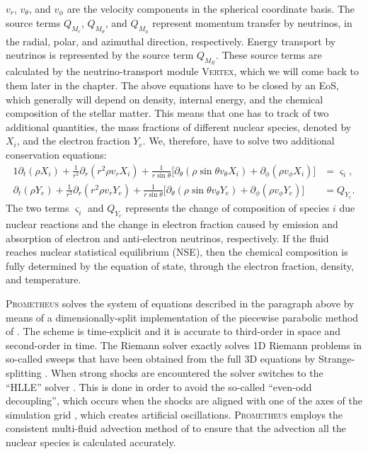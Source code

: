 $v_r$, $v_{\theta}$, and $v_{\phi}$ are the velocity components in the spherical
coordinate basis. The source terms $Q_{M_{r}}$, $Q_{M_{\theta}}$, and $Q_{M_{\phi}}$ represent
momentum transfer by neutrinos, in the radial, polar, and azimuthal direction, respectively.
Energy transport by neutrinos is represented by the source term $Q_{M_{E}}$. These source terms are calculated
by the neutrino-transport module \textsc{Vertex}, which we will come back to them later in the chapter.
The above equations have to be closed by an EoS, which generally will depend on 
density, internal energy, and the chemical composition of the stellar matter.
This means that one has to track of two additional quantities, the mass fractions
of different nuclear species, denoted by $X_i$, and the electron fraction $Y_e$. We, therefore,
have to solve two additional conservation equations:
\begin{alignat}{1}
\partial_t (\rho X_i) + \frac{1}{r^2} \partial_r (r^2 \rho v_r X_i) + \frac{1}{r \sin{\theta}} \bigg[ \partial_{\theta} (\rho \sin{\theta} v_{\theta} X_i) + \partial_{\phi} (\rho v_{\phi} X_i) \bigg] &= \varsigma_i, \label{eqN:contxi} \\
\partial_t (\rho Y_e) + \frac{1}{r^2} \partial_r (r^2 \rho v_r Y_e) + \frac{1}{r \sin{\theta}} \bigg[ \partial_{\theta} (\rho \sin{\theta} v_{\theta} Y_e) + \partial_{\phi} (\rho v_{\phi} Y_e) \bigg] &= Q_{Y_e}. \label{eqN:contye}
\end{alignat}
The two terms $\varsigma_i$ and $Q_{Y_e}$ represents the change of composition of species $i$ due nuclear reactions
and the change in electron fraction caused by emission and absorption of electron and anti-electron neutrinos,
respectively. If the fluid reaches nuclear statistical equilibrium (NSE), then the chemical 
composition is fully determined by the equation of state, through the electron fraction, density, and
temperature.

\textsc{Prometheus} solves the system of equations described in the paragraph above
by means of a dimensionally-split implementation of the piecewise parabolic method of \cite{colella_84}.
The scheme is time-explicit and it is accurate to third-order in space and second-order in time.
The Riemann solver exactly solves 1D Riemann problems in so-called sweeps
that have been obtained from the full 3D equations by Strange-splitting \citep{strang_68}.
When strong shocks are encountered the solver switches to the ``HLLE'' solver \citep{einfeldt_88}.
This is done in order to avoid the so-called ``even-odd decoupling'', which occurs
when the shocks are aligned with one of the axes of the simulation grid \citep{quirk_94,kifonidis_03},
which creates artificial oscillations. \textsc{Prometheus} employs the 
consistent multi-fluid advection method of \cite{plewa_99} to ensure that the advection all the nuclear species
is calculated accurately.

